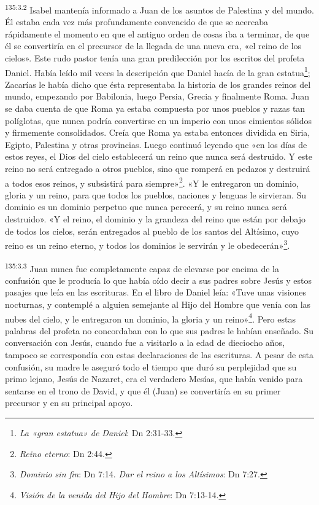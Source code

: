 \par
\textsuperscript{135:3.2} Isabel mantenía informado a Juan de los asuntos de Palestina y del mundo. Él estaba cada vez más profundamente convencido de que se acercaba rápidamente el momento en que el antiguo orden de cosas iba a terminar, de que él se convertiría en el precursor de la llegada de una nueva era, «el reino de los cielos». Este rudo pastor tenía una gran predilección por los escritos del profeta Daniel. Había leído mil veces la descripción que Daniel hacía de la gran estatua\footnote{\textit{La «gran estatua» de Daniel}: Dn 2:31-33.}; Zacarías le había dicho que ésta representaba la historia de los grandes reinos del mundo, empezando por Babilonia, luego Persia, Grecia y finalmente Roma. Juan se daba cuenta de que Roma ya estaba compuesta por unos pueblos y razas tan políglotas, que nunca podría convertirse en un imperio con unos cimientos sólidos y firmemente consolidados. Creía que Roma ya estaba entonces dividida en Siria, Egipto, Palestina y otras provincias. Luego continuó leyendo que «en los días de estos reyes, el Dios del cielo establecerá un reino que nunca será destruido. Y este reino no será entregado a otros pueblos, sino que romperá en pedazos y destruirá a todos esos reinos, y subsistirá para siempre»\footnote{\textit{Reino eterno}: Dn 2:44.}. «Y le entregaron un dominio, gloria y un reino, para que todos los pueblos, naciones y lenguas le sirvieran. Su dominio es un dominio perpetuo que nunca perecerá, y su reino nunca será destruido». «Y el reino, el dominio y la grandeza del reino que están por debajo de todos los cielos, serán entregados al pueblo de los santos del Altísimo, cuyo reino es un reino eterno, y todos los dominios le servirán y le obedecerán»\footnote{\textit{Dominio sin fin}: Dn 7:14. \textit{Dar el reino a los Altísimos}: Dn 7:27.}.

\par
\textsuperscript{135:3.3} Juan nunca fue completamente capaz de elevarse por encima de la confusión que le producía lo que había oído decir a sus padres sobre Jesús y estos pasajes que leía en las escrituras. En el libro de Daniel leía: «Tuve unas visiones nocturnas, y contemplé a alguien semejante al Hijo del Hombre que venía con las nubes del cielo, y le entregaron un dominio, la gloria y un reino»\footnote{\textit{Visión de la venida del Hijo del Hombre}: Dn 7:13-14.}. Pero estas palabras del profeta no concordaban con lo que sus padres le habían enseñado. Su conversación con Jesús, cuando fue a visitarlo a la edad de dieciocho años, tampoco se correspondía con estas declaraciones de las escrituras. A pesar de esta confusión, su madre le aseguró todo el tiempo que duró su perplejidad que su primo lejano, Jesús de Nazaret, era el verdadero Mesías, que había venido para sentarse en el trono de David, y que él (Juan) se convertiría en su primer precursor y en su principal apoyo.

